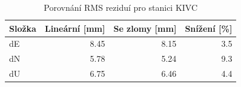 \begin{table}[H]
\centering
\small
\caption{Porovnání RMS reziduí pro stanici KIVC}
\label{tab:gop25wd04_stcd_kivc_residual_rms_comparison}
\begin{tabular}{lrrr}
\toprule
Složka & Lineární [mm] & Se zlomy [mm] & Snížení [\%] \\
\midrule
dE & 8.45 & 8.15 & 3.5 \\
dN & 5.78 & 5.24 & 9.3 \\
dU & 6.75 & 6.46 & 4.4 \\
\bottomrule
\end{tabular}
\end{table}
